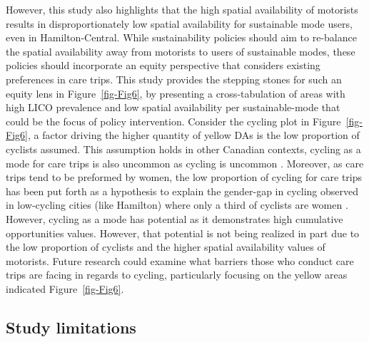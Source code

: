 \documentclass[
  authoryear,
  preprint,
  3p]{elsarticle}
\begin{document}
However, this study also highlights that the high spatial availability
of motorists results in disproportionately low spatial availability for
sustainable mode users, even in Hamilton-Central. While sustainability
policies should aim to re-balance the spatial availability away from
motorists to users of sustainable modes, these policies should
incorporate an equity perspective that considers existing preferences in
care trips. This study provides the stepping stones for such an equity
lens in Figure~\ref{fig-Fig6}, by presenting a cross-tabulation of areas
with high LICO prevalence and low spatial availability per
sustainable-mode that could be the focus of policy intervention.
Consider the cycling plot in Figure~\ref{fig-Fig6}, a factor driving the
higher quantity of yellow DAs is the low proportion of cyclists assumed.
This assumption holds in other Canadian contexts, cycling as a mode for
care trips is also uncommon as cycling is uncommon
\citep{ravensbergenExploratoryAnalysisMobility2022}. Moreover, as care
trips tend to be preformed by women, the low proportion of cycling for
care trips has been put forth as a hypothesis to explain the gender-gap
in cycling observed in low-cycling cities (like Hamilton) where only a
third of cyclists are women
\citep{ravensbergenFeministGeographiesCycling2019, prati2018gender}.
However, cycling as a mode has potential as it demonstrates high
cumulative opportunities values. However, that potential is not being
realized in part due to the low proportion of cyclists and the higher
spatial availability values of motorists. Future research could examine
what barriers those who conduct care trips are facing in regards to
cycling, particularly focusing on the yellow areas indicated
Figure~\ref{fig-Fig6}.

\subsection{Study limitations}\label{study-limitations}
\end{document}
